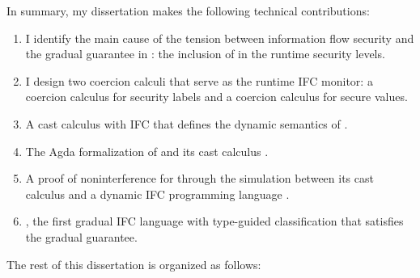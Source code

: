 In summary, my dissertation makes the following technical contributions:

\begin{enumerate}
\item I identify the main cause of the tension between information flow security
  and the gradual guarantee in \GSLRef: the inclusion of \unk in the runtime
  security levels.
\item I design two coercion calculi that serve as the runtime IFC monitor: a
  coercion calculus for security labels and a coercion calculus for secure
  values.
\item A cast calculus \CC with IFC that defines the dynamic semantics of
  \Surface.
\item The Agda formalization of \Surface and its cast calculus \CC.
\item A proof of noninterference for \Surface through the simulation between its
  cast calculus \CC and a dynamic IFC programming language \DynIFC.
\item \Surface, the first gradual IFC language with type-guided
  classification that satisfies the gradual guarantee.
\end{enumerate}

The rest of this dissertation is organized as follows:

